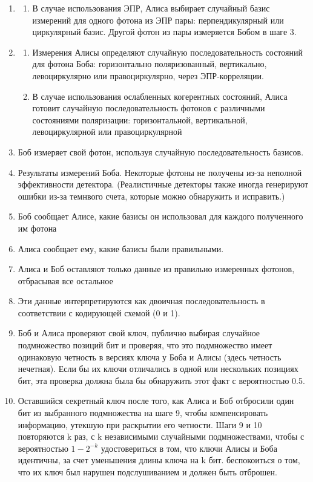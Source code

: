 \begin{enumerate}
    \item \begin{enumerate}
        \item В случае использования ЭПР, Алиса выбирает случайный базис измерений для одного фотона из ЭПР пары: перпендикулярный или циркулярный базис. Другой фотон из пары измеряется Бобом в шаге 3.
    \end{enumerate}
    \item \begin{enumerate}
        \item Измерения Алисы определяют случайную последовательность состояний для фотона Боба: горизонтально поляризованный, вертикально, левоциркулярно или правоциркулярно, через ЭПР-корреляции.
        \item В случае использования ослабленных когерентных состояний, Алиса готовит случайную последовательность фотонов с различными состояниями поляризации: горизонтальной, вертикальной, левоциркулярной или правоциркулярной
    \end{enumerate}
    \item Боб измеряет свой фотон, используя случайную последовательность базисов.
    \item Результаты измерений Боба. Некоторые фотоны не получены из-за неполной эффективности детектора. (Реалистичные детекторы также иногда генерируют ошибки из-за темнвого счета, которые можно обнаружить и исправить.)
    \item Боб сообщает Алисе, какие базисы он использовал для каждого полученного им фотона
    \item Алиса сообщает ему, какие базисы были правильными.
    \item Алиса и Боб оставляют только данные из правильно измеренных фотонов, отбрасывая все остальное
    \item Эти данные интерпретируются как двоичная последовательность в соответствии с кодирующей схемой (0 и 1).
    \item Боб и Алиса проверяют свой ключ, публично выбирая случайное подмножество позиций бит и проверяя, что это подмножество имеет одинаковую четность в версиях ключа у Боба и Алисы (здесь четность нечетная). Если бы их ключи отличались в одной или нескольких позициях бит, эта проверка должна была бы обнаружить этот факт с вероятностью 0.5.
    \item Оставшийся секретный ключ после того, как Алиса и Боб отбросили один бит из выбранного подмножества на шаге 9, чтобы компенсировать информацию, утекшую при раскрытии его четности. Шаги 9 и 10 повторяются k раз, с k независимыми случайными подмножествами, чтобы с вероятностью $1 - 2^{-k}$ удостовериться в том, что ключи Алисы и Боба идентичны, за счет уменьшения длины ключа на k бит. беспокоиться о том, что их ключ был нарушен подслушиванием и должен быть отброшен. 
\end{enumerate}

